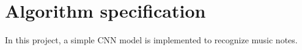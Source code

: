 \chapter{Algorithm specification}
\indent\indent
	In this project, a simple CNN model is implemented to recognize music notes. \\
	
